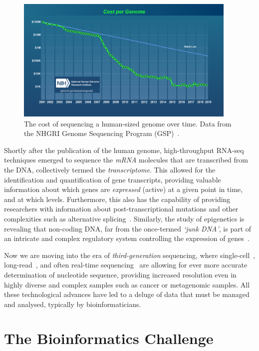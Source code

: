 \begin{justify}
\begin{figure}[h!]
    \centering
    \includegraphics[width=300pt]{chapters/images/introduction/sequencing_cost_moore.png}
    \caption{The cost of sequencing a human-sized genome over time. Data from the NHGRI Genome Sequencing Program (GSP)~\cite{url-moore}.}\label{fig:seqcost}
\end{figure}

Shortly after the publication of the human genome, high-throughput RNA-seq techniques emerged to sequence the \emph{mRNA} molecules that are transcribed from the DNA, collectively termed the \emph{transcriptome}. This allowed for the identification and quantification of gene transcripts, providing valuable information about which genes are \emph{expressed} (active) at a given point in time, and at which levels. Furthermore, this also has the capability of providing researchers with information about post-transcriptional mutations and other complexities such as alternative splicing~\cite{wang2009rna}. Similarly, the study of epigenetics is revealing that non-coding DNA, far from the once-termed \textit{`junk DNA'}, is part of an intricate and complex regulatory system controlling the expression of genes~\cite{zuckerkandl2007combinatorial}.

Now we are moving into the era of \emph{third-generation} sequencing, where single-cell~\cite{gawad2016single}, long-read~\cite{koren2015one}, and often real-time sequencing~\cite{flusberg2010direct} are allowing for ever more accurate determination of nucleotide sequence, providing increased resolution even in highly diverse and complex samples such as cancer or metagenomic samples. All these technological advances have led to a deluge of data that must be managed and analysed, typically by bioinformaticians.


\section{The Bioinformatics Challenge}


\end{justify}
